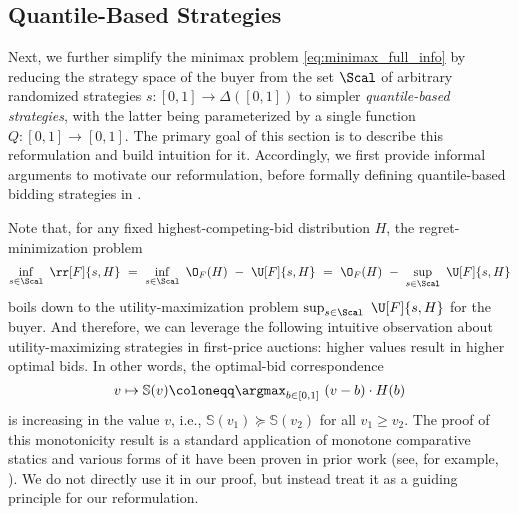 \subsection{Quantile-Based Strategies}\label{sec:quantile-strat}

Next, we further simplify the minimax problem \eqref{eq:minimax_full_info} by reducing the strategy space of the buyer from the set $\Scal$ of arbitrary randomized strategies $s: [0,1] \to \Delta([0,1])$ to simpler \emph{quantile-based strategies}, with the latter being parameterized by a single function $Q:[0,1] \to [0,1]$. The primary goal of this section is to describe this reformulation and build intuition for it. Accordingly, we first provide informal arguments to motivate our reformulation, before formally defining quantile-based bidding strategies in .



Note that, for any fixed highest-competing-bid distribution $H$, the regret-minimization problem
\begin{align*}
	\inf_{s \in \Scal}\ \rr[F]{s,H}\ =\ \inf_{s \in \Scal}\ \O_F(H)\ -\ \U[F]{s,H}\ =\ \O_F(H)\ -\ \sup_{s \in \Scal}\ \U[F]{s,H}
\end{align*}
boils down to the utility-maximization problem $\sup_{s \in \Scal}\ \U[F]{s,H}$ for the buyer. And therefore, we can leverage the following intuitive observation about utility-maximizing strategies in first-price auctions: higher values result in higher optimal bids. In other words, the optimal-bid correspondence
\begin{equation*}
    v \mapsto {\mathbb S(v) \coloneqq \argmax_{b \in [0,1]} \ (v-b)\cdot H(b)}
\end{equation*}
is increasing in the value $v$, i.e., $\mathbb S(v_1) \succcurlyeq \mathbb S(v_2)$ for all $v_1 \geq v_2$. 
The proof of this monotonicity result is a standard application of monotone comparative statics and various forms of it have been proven in prior work (see, for example, \citealt{kumar2024strategically}). We do not directly use it in our proof, but instead treat it as a guiding principle for our reformulation.

